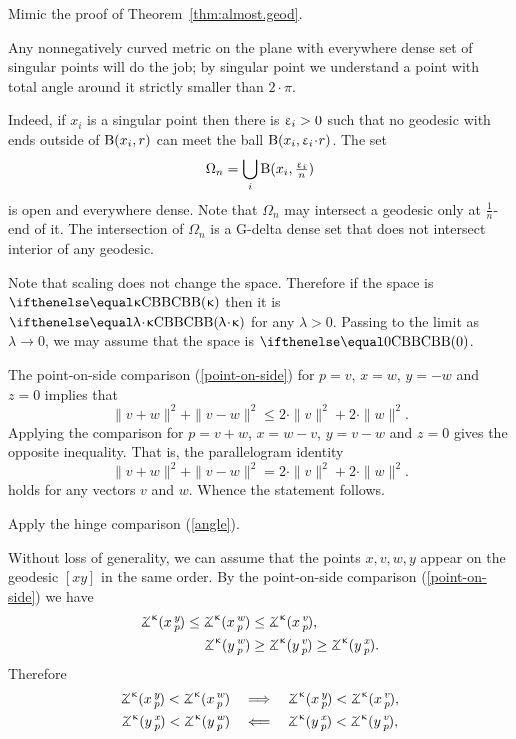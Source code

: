 Mimic the proof of Theorem~\ref{thm:almost.geod}.

Any nonnegatively curved metric on the plane with everywhere dense set of singular points will do the job;
by singular point we understand a point with total angle around it strictly smaller than $2\cdot\pi$.

Indeed, if $x_i$ is a singular point then there is $\upvarepsilon_i>0$ such that no geodesic with ends outside of $\mathrm{B}{}(x_i,r)$ can meet the ball $\oBall(x_i,\eps_i\cdot r)$.
The set 
\[\Omega_n=\bigcup_i \mathrm{B}{}(x_i,\tfrac{\upvarepsilon_i}n)\]
is open and everywhere dense.
Note that $\Omega_n$ may intersect a geodesic only at $\tfrac1n$-end of it.
The intersection of $\Omega_n$ is a G-delta dense set that does not intersect interior of any geodesic.

Note that scaling does not change the space.
Therefore if the space is $\Alex\kappa$ then it is $\Alex{\lambda\cdot\kappa}$ for any $\lambda>0$.
Passing to the limit as $\lambda\to 0$, we may assume that the space is $\Alex0$.

The point-on-side comparison (\ref{point-on-side}) for $p=v$, $x=w$, $y=-w$ and $z=0$ implies that 
\[\|v+w\|^2+\|v-w\|^2\le 2\cdot\|v\|^2+2\cdot\|w\|^2.\]
Applying the comparison for 
$p=v+w$, $x=w-v$, $y=v-w$ and $z=0$ gives the opposite inequality.
That is, the parallelogram identity
\[\|v+w\|^2+\|v-w\|^2= 2\cdot\|v\|^2+2\cdot\|w\|^2.\]
holds for any vectors $v$ and $w$.
Whence the statement follows.

Apply the hinge comparison (\ref{angle}).

 Without loss of generality, we can assume that the points $x,v,w,y$ appear on the geodesic $[xy]$ in the same order.
By the point-on-side comparison (\ref{point-on-side}) we have
\begin{align*}
\angk\kappa xyp\le\angk\kappa xwp&\le \angk\kappa xvp,
\\
\angk\kappa ywp&\ge\angk\kappa yvp\ge\angk\kappa yxp.
\end{align*}
Therefore
\begin{align*}\angk\kappa xyp<\angk\kappa xwp
\quad&\Longrightarrow\quad
\angk\kappa xyp<\angk\kappa xvp,
\\
\angk\kappa yxp<\angk\kappa ywp
\quad&\Longleftarrow\quad
\angk\kappa yxp<\angk\kappa yvp,
\end{align*}

